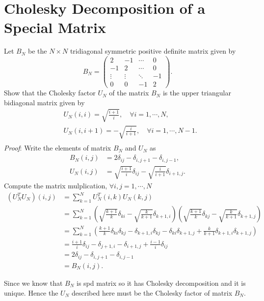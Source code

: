 \documentclass[paper=a4, fontsize=11pt]{scrartcl} %
\numberwithin{equation}{section} %
\numberwithin{figure}{section} %
\numberwithin{table}{section} %
\begin{document}
\section{Cholesky Decomposition of a Special Matrix}
Let $B_N$ be the $N\times N$ tridiagonal symmetric positive definite matrix given by 
$$
B_N = \begin{pmatrix}
2 & -1 & \cdots & 0\\
-1 & 2 & \cdots & 0\\
\vdots & \vdots & \ddots &-1\\
0 & 0 & -1 &2
\end{pmatrix}.
$$
Show that the Cholesky factor $U_N$ of the matrix $B_N$ is the upper triangular bidiagonal matrix given by
\begin{align}
\nonumber & U_N(i,i) = \sqrt{\frac{i+1}{i}}, \quad \forall i=1,\cdots,N,\\
\nonumber & U_N(i,i+1) = -\sqrt{\frac{i}{i+1}}, \quad \forall i=1,\cdots,N-1.\\
\end{align}
\textit{Proof}: Write the elements of matrix $B_N$ and $U_N$ as
\begin{align}
\nonumber B_N(i,j) &= 2\delta_{ij} - \delta_{i,j+1} - \delta_{i,j-1},\\
\nonumber U_N(i,j) &= \sqrt{\frac{i+1}{i}}\delta_{ij}-\sqrt{\frac{i}{i+1}}\delta_{i+1,j}.
\end{align}
Compute the matrix mulplication, $\forall i,j=1,\cdots,N$
\begin{align}
\nonumber \left(U_N^T U_N\right)(i,j) &= \sum_{k=1}^{N} U_N^T(i,k)U_N(k,j) \\
\nonumber &= \sum_{k=1}^{N}  \left( \sqrt{\frac{k+1}{k}}\delta_{ki}-\sqrt{\frac{k}{k+1}}\delta_{k+1,i} \right)
\left( \sqrt{\frac{k+1}{k}}\delta_{kj}-\sqrt{\frac{k}{k+1}}\delta_{k+1,j} \right) \\
\nonumber &= \sum_{k=1}^{N}  \left(\frac{k+1}{k}\delta_{ki}\delta_{kj}  -\delta_{k+1,i}\delta_{kj} -\delta_{ki}\delta_{k+1,j}  + \frac{k}{k+1} \delta_{k+1,i}\delta_{k+1,j}   \right) \\
\nonumber &= \frac{i+1}{i}\delta_{ij}  -\delta_{j+1,i} -\delta_{i+1,j}  + \frac{i-1}{i} \delta_{ij} \\
\nonumber &= 2\delta_{ij} - \delta_{i,j+1} - \delta_{i,j-1}\\
\nonumber &= B_N(i,j).
\end{align}

Since we know that $B_N$ is spd matrix so it has Cholesky decomposition and it is unique. Hence the $U_N$ described here must be the Cholesky factor of matrix $B_N$.
\end{document}
